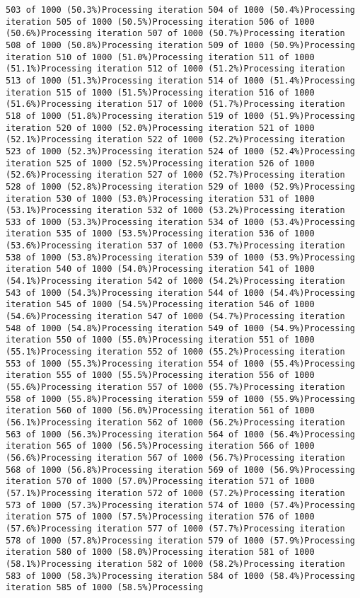 \documentclass[
]{article}
\begin{document}
\begin{verbatim}
503 of 1000 (50.3%)Processing iteration 504 of 1000 (50.4%)Processing iteration 505 of 1000 (50.5%)Processing iteration 506 of 1000 (50.6%)Processing iteration 507 of 1000 (50.7%)Processing iteration 508 of 1000 (50.8%)Processing iteration 509 of 1000 (50.9%)Processing iteration 510 of 1000 (51.0%)Processing iteration 511 of 1000 (51.1%)Processing iteration 512 of 1000 (51.2%)Processing iteration 513 of 1000 (51.3%)Processing iteration 514 of 1000 (51.4%)Processing iteration 515 of 1000 (51.5%)Processing iteration 516 of 1000 (51.6%)Processing iteration 517 of 1000 (51.7%)Processing iteration 518 of 1000 (51.8%)Processing iteration 519 of 1000 (51.9%)Processing iteration 520 of 1000 (52.0%)Processing iteration 521 of 1000 (52.1%)Processing iteration 522 of 1000 (52.2%)Processing iteration 523 of 1000 (52.3%)Processing iteration 524 of 1000 (52.4%)Processing iteration 525 of 1000 (52.5%)Processing iteration 526 of 1000 (52.6%)Processing iteration 527 of 1000 (52.7%)Processing iteration 528 of 1000 (52.8%)Processing iteration 529 of 1000 (52.9%)Processing iteration 530 of 1000 (53.0%)Processing iteration 531 of 1000 (53.1%)Processing iteration 532 of 1000 (53.2%)Processing iteration 533 of 1000 (53.3%)Processing iteration 534 of 1000 (53.4%)Processing iteration 535 of 1000 (53.5%)Processing iteration 536 of 1000 (53.6%)Processing iteration 537 of 1000 (53.7%)Processing iteration 538 of 1000 (53.8%)Processing iteration 539 of 1000 (53.9%)Processing iteration 540 of 1000 (54.0%)Processing iteration 541 of 1000 (54.1%)Processing iteration 542 of 1000 (54.2%)Processing iteration 543 of 1000 (54.3%)Processing iteration 544 of 1000 (54.4%)Processing iteration 545 of 1000 (54.5%)Processing iteration 546 of 1000 (54.6%)Processing iteration 547 of 1000 (54.7%)Processing iteration 548 of 1000 (54.8%)Processing iteration 549 of 1000 (54.9%)Processing iteration 550 of 1000 (55.0%)Processing iteration 551 of 1000 (55.1%)Processing iteration 552 of 1000 (55.2%)Processing iteration 553 of 1000 (55.3%)Processing iteration 554 of 1000 (55.4%)Processing iteration 555 of 1000 (55.5%)Processing iteration 556 of 1000 (55.6%)Processing iteration 557 of 1000 (55.7%)Processing iteration 558 of 1000 (55.8%)Processing iteration 559 of 1000 (55.9%)Processing iteration 560 of 1000 (56.0%)Processing iteration 561 of 1000 (56.1%)Processing iteration 562 of 1000 (56.2%)Processing iteration 563 of 1000 (56.3%)Processing iteration 564 of 1000 (56.4%)Processing iteration 565 of 1000 (56.5%)Processing iteration 566 of 1000 (56.6%)Processing iteration 567 of 1000 (56.7%)Processing iteration 568 of 1000 (56.8%)Processing iteration 569 of 1000 (56.9%)Processing iteration 570 of 1000 (57.0%)Processing iteration 571 of 1000 (57.1%)Processing iteration 572 of 1000 (57.2%)Processing iteration 573 of 1000 (57.3%)Processing iteration 574 of 1000 (57.4%)Processing iteration 575 of 1000 (57.5%)Processing iteration 576 of 1000 (57.6%)Processing iteration 577 of 1000 (57.7%)Processing iteration 578 of 1000 (57.8%)Processing iteration 579 of 1000 (57.9%)Processing iteration 580 of 1000 (58.0%)Processing iteration 581 of 1000 (58.1%)Processing iteration 582 of 1000 (58.2%)Processing iteration 583 of 1000 (58.3%)Processing iteration 584 of 1000 (58.4%)Processing iteration 585 of 1000 (58.5%)Processing 
\end{verbatim}
\end{document}
